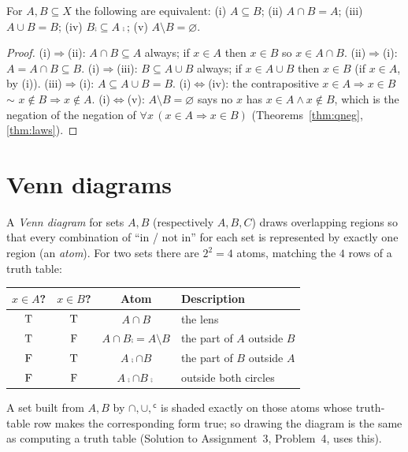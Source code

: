 \begin{proposition}\label{prop:inclusion-crit}
	For $A,B\subseteq X$ the following are equivalent: (i) $A\subseteq B$; (ii) $A\cap B=A$; (iii) $A\cup B=B$; (iv) $B\comp\subseteq A\comp$; (v) $A\setminus B=\varnothing$.
\end{proposition}
\begin{proof}
	(i)$\Rightarrow$(ii): $A\cap B\subseteq A$ always; if $x\in A$ then $x\in B$ so $x\in A\cap B$. (ii)$\Rightarrow$(i): $A=A\cap B\subseteq B$. (i)$\Rightarrow$(iii): $B\subseteq A\cup B$ always; if $x\in A\cup B$ then $x\in B$ (if $x\in A$, by (i)). (iii)$\Rightarrow$(i): $A\subseteq A\cup B=B$. (i)$\iff$(iv): the contrapositive $x\in A\Rightarrow x\in B$ $\sim$ $x\notin B\Rightarrow x\notin A$. (i)$\iff$(v): $A\setminus B=\varnothing$ says no $x$ has $x\in A\wedge x\notin B$, which is the negation of the negation of $\forall x\,(x\in A\Rightarrow x\in B)$ (Theorems~\ref{thm:qneg}, \ref{thm:laws}).
\end{proof}

\section{Venn diagrams}

A \emph{Venn diagram} for sets $A,B$ (respectively $A,B,C$) draws overlapping regions so that every combination of ``in / not in'' for each set is represented by exactly one region (an \emph{atom}). For two sets there are $2^2=4$ atoms, matching the $4$ rows of a truth table:
\begin{center}
	\begin{tabular}{@{}cccp{6.5cm}@{}}
		\toprule
		$x\in A$? & $x\in B$? & Atom & Description\\
		\midrule
		$\mathrm{T}$&$\mathrm{T}$& $A\cap B$ & the lens\\
		$\mathrm{T}$&$\mathrm{F}$& $A\cap B\comp=A\setminus B$ & the part of $A$ outside $B$\\
		$\mathrm{F}$&$\mathrm{T}$& $A\comp\cap B$ & the part of $B$ outside $A$\\
		$\mathrm{F}$&$\mathrm{F}$& $A\comp\cap B\comp$ & outside both circles\\
		\bottomrule
	\end{tabular}
\end{center}
A set built from $A,B$ by $\cap,\cup,{}^{\mathsf c}$ is shaded exactly on those atoms whose truth-table row makes the corresponding form true; so drawing the diagram is the same as computing a truth table (Solution to Assignment~3, Problem~4, uses this).


